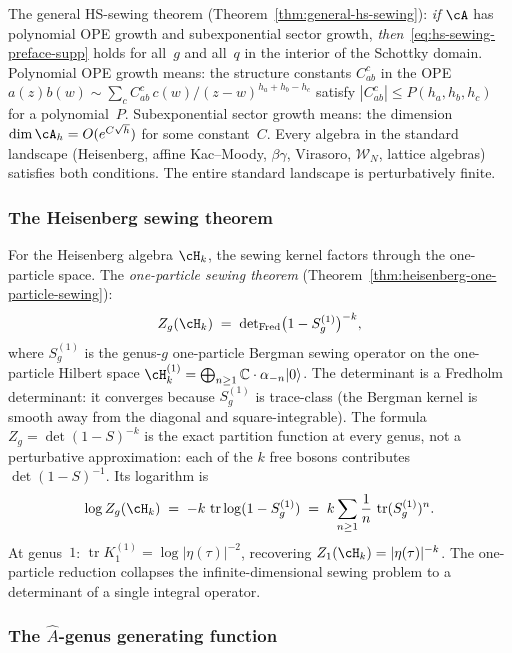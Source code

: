 The general HS-sewing theorem (Theorem~\ref{thm:general-hs-sewing}):
\emph{if} $\cA$ has polynomial OPE growth and subexponential
sector growth, \emph{then}~\eqref{eq:hs-sewing-preface-supp}
holds for all~$g$ and all~$q$ in the interior of the Schottky
domain. Polynomial OPE growth means: the structure constants
$C^c_{ab}$ in the OPE $a(z)b(w)\sim\sum_c C^c_{ab}\,c(w)
/(z-w)^{h_a+h_b-h_c}$ satisfy
$|C^c_{ab}|\le P(h_a,h_b,h_c)$ for a polynomial~$P$.
Subexponential sector growth means: the dimension
$\dim\cA_h=O(e^{C\sqrt{h}})$ for some constant~$C$. Every
algebra in the standard landscape (Heisenberg, affine
Kac--Moody, $\beta\gamma$, Virasoro, $\mathcal W_N$, lattice
algebras) satisfies both conditions. The entire standard
landscape is perturbatively finite.

\subsubsection*{The Heisenberg sewing theorem}

For the Heisenberg algebra $\cH_k$, the sewing kernel factors
through the one-particle space. The \emph{one-particle sewing
theorem} (Theorem~\ref{thm:heisenberg-one-particle-sewing}):
\[
Z_g(\cH_k)
\;=\;
\det\nolimits_{\mathrm{Fred}}
\bigl(1- S_g^{(1)}\bigr)^{-k},
\]
where $S_g^{(1)}$ is the genus-$g$ one-particle Bergman sewing
operator on the one-particle Hilbert space
$\cH_k^{(1)} = \bigoplus_{n \ge 1}
\mathbb{C}\cdot\alpha_{-n}|0\rangle$.
The determinant is a Fredholm determinant: it converges because
$S_g^{(1)}$ is trace-class (the Bergman kernel
is smooth away from the diagonal and square-integrable).
The formula $Z_g=\det(1-S)^{-k}$ is the exact partition
function at every genus, not a perturbative approximation: each
of the $k$ free bosons contributes $\det(1-S)^{-1}$. Its
logarithm is
\[
\log Z_g(\cH_k)
\;=\;
-k\,\operatorname{tr}\log(1-S_g^{(1)})
\;=\;
k\sum_{n\ge 1}\frac{1}{n}\,
\operatorname{tr}(S_g^{(1)})^n.
\]
At genus~$1$: $\operatorname{tr}K_1^{(1)}=\log|\eta(\tau)|^{-2}$,
recovering $Z_1(\cH_k)=|\eta(\tau)|^{-k}$. The one-particle
reduction collapses the infinite-dimensional sewing problem to
a determinant of a single integral operator.

\subsubsection*{The $\hat A$-genus generating function}

